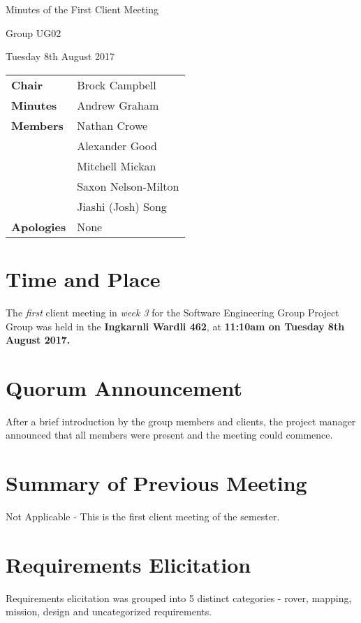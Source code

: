 \documentclass{article}
\begin{document}
\begin{center}    
{\huge Minutes of the First Client Meeting \par}
\vspace{0.5cm}
{\large Group UG02 \par}
\vspace{0.5cm}
{\large Tuesday 8th August 2017 \par}
\vspace{0.5cm}
\end{center}

\begin{flushleft}
\begin{tabular}{ll}
{\bfseries Chair} & Brock Campbell \\
{\bfseries Minutes} & Andrew Graham \\
{\bfseries Members} & Nathan Crowe \\
 & Alexander Good \\
 & Mitchell Mickan \\
 & Saxon Nelson-Milton \\
 & Jiashi (Josh) Song \\
{\bfseries Apologies} & None\\
\end{tabular}
\end{flushleft}

\section{Time and Place}
The {\itshape first} client meeting in {\itshape week 3} for the Software Engineering Group Project Group was held in the {\bfseries Ingkarnli Wardli 462}, at {\bfseries 11:10am on Tuesday 8th August 2017.} 

\section{Quorum Announcement}
	After a brief introduction by the group members and clients, the project manager announced that all members were present and the meeting could commence.
    
\section{Summary of Previous Meeting}
 	Not Applicable - This is the first client meeting of the semester.
\section{Requirements Elicitation}
	Requirements elicitation was grouped into 5 distinct categories - rover, mapping, mission, design and uncategorized requirements. 
    
\end{document}
